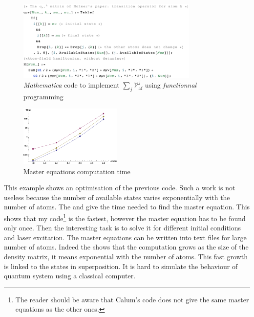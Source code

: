 \documentclass[%
]{scrreprt}
\newcommand{\mat}{\emph{Mathematica}\xspace}
\newcommand{\mc}[1]{\mathcal{#1}}
\begin{document}
\begin{figure}[h]
  \centering
  \includegraphics[width=0.8\textwidth]{MathematicaSampleCode.pdf}
  \caption{\label{Mathematica-code}\mat code to implement $\sum_j \mc{V}_{\mathrm{af}}^j$ using \emph{functionnal} programming}
\end{figure}

\begin{figure}
  \vspace{-10pt}
  \centering
  \includegraphics[width=0.45\textwidth]{benchmark.pdf}
  \caption{\label{benchmark-plot}Master equations computation time}
  \vspace{-20pt}
\end{figure}


\par This example shows an optimisation of the previous code. Such a work is not useless because the number of available states varies exponentially with the number of atoms. The  and  give the time needed to find the master equation. This shows that my code\footnote{The reader should be aware that Calum's code does not give the same master equations as the other ones.} is the fastest, however the master equation has to be found only once. Then the interesting task is to solve it for different initial conditions and laser excitation. The master equations can be written into text files for large number of atoms. Indeed the  shows that the computation grows as the size of the density matrix, it means exponential with the number of atoms. This fast growth is linked to the states in superposition. It is hard to simulate the behaviour of quantum system using a classical computer.
\end{document}
